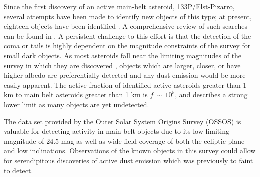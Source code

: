 \documentclass[iop,apj]{emulateapj}
\begin{document}



Since the first discovery of an active main-belt asteroid, 133P/Elst-Pizarro, several attempts have been made to identify new objects of this type; at present, eighteen objects have been identified \citep{jewitt15}. A comprehensive review of such searches can be found in \citep{hsieh15}.  A persistent challenge to this effort is that the detection of the coma or tails is highly dependent on the magnitude constraints of the survey for small dark objects. As most asteroids fall near the limiting magnitudes of the survey in which they are discovered \cite{jewitt15}%
, objects which are larger, closer, or have higher albedo are preferentially detected and any dust emission would be more easily apparent. The active fraction of identified active asteroids greater than 1 km to main belt asteroids greater than 1 km is $f \, \sim \, 10^5$, and describes a strong lower limit as many objects are yet undetected. \citep{jewitt15} %

The data set provided by the Outer Solar System Origins Survey (OSSOS) is valuable for detecting activity in main belt objects due to its low limiting magnitude of 24.5 mag as well as wide field coverage of both the ecliptic plane and low inclinations. Observations of the known objects in this survey could allow for serendipitous discoveries of active dust emission which was previously to faint to detect. 
\end{document}
